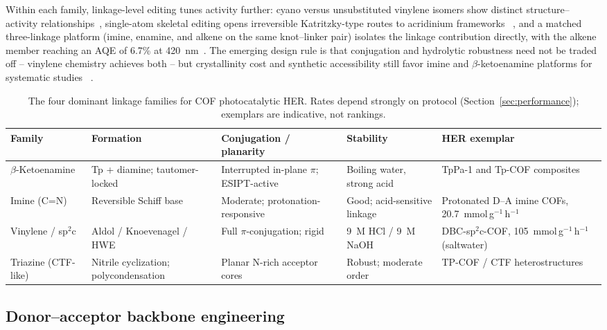 Within each family, linkage-level editing tunes activity further: cyano
versus unsubstituted vinylene isomers show distinct structure--activity
relationships~\cite{nagar2025isomeric}, single-atom skeletal editing opens
irreversible Katritzky-type routes to acridinium frameworks
~\cite{pan2025rational}, and a matched three-linkage platform
(imine, enamine, and alkene on the same knot--linker pair) isolates the
linkage contribution directly, with the alkene member reaching an AQE of 6.7\% at
420~nm~\cite{mo2020alkene}. The emerging design rule is that conjugation
and hydrolytic robustness need not be traded off -- vinylene chemistry
achieves both -- but crystallinity cost and synthetic accessibility still
favor imine and $\beta$-ketoenamine platforms for systematic studies
~\cite{peng2025sp2,wu2025recent}.

\begin{table}[t]
  \centering
  \caption{The four dominant linkage families for COF photocatalytic HER.
  Rates depend strongly on protocol (Section~\ref{sec:performance});
  exemplars are indicative, not rankings.}
  \label{tab:linkages}
  \small
  \begin{tabular}{P{2.4cm} P{2.6cm} P{3.0cm} P{2.6cm} P{3.2cm}}
    \toprule
    Family & Formation & Conjugation / planarity & Stability & HER exemplar \\
    \midrule
    $\beta$-Ketoenamine & Tp + diamine; tautomer-locked
      & Interrupted in-plane $\pi$; ESIPT-active
      & Boiling water, strong acid
      & TpPa-1 and Tp-COF composites~\cite{xue2023research,wang2023review} \\
    Imine (C=N) & Reversible Schiff base
      & Moderate; protonation-responsive
      & Good; acid-sensitive linkage
      & Protonated D--A imine COFs, 20.7~mmol\,g$^{-1}$\,h$^{-1}$
        ~\cite{yang2021protonated} \\
    Vinylene / sp$^2$c & Aldol / Knoevenagel / HWE
      & Full $\pi$-conjugation; rigid
      & 9~M HCl / 9~M NaOH
      & DBC-sp$^2$c-COF, 105~mmol\,g$^{-1}$\,h$^{-1}$ (saltwater)
        ~\cite{yu2025topology,chen2019designed} \\
    Triazine (CTF-like) & Nitrile cyclization; polycondensation
      & Planar N-rich acceptor cores
      & Robust; moderate order
      & TP-COF / CTF heterostructures~\cite{hao20212d,xu20202d} \\
    \bottomrule
  \end{tabular}
\end{table}

\subsection{Donor--acceptor backbone engineering}
\label{sec:da}

